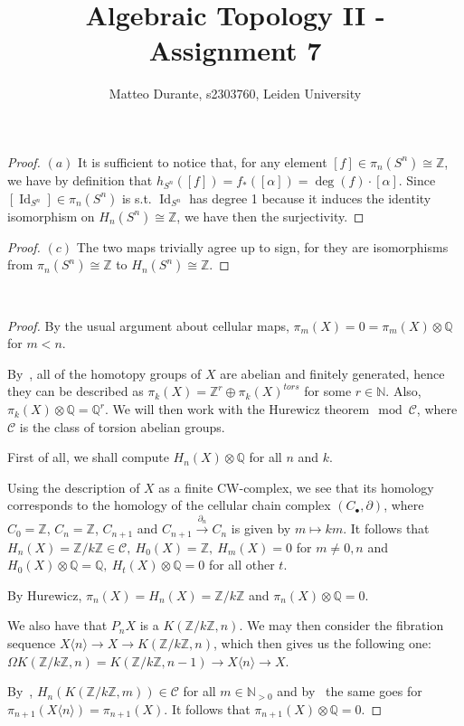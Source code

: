 \documentclass{article}
\newcommand{\numberset}{\mathbb}
\newcommand{\N}{\numberset{N}}
\newcommand{\Z}{\numberset{Z}}
\newcommand{\Q}{\numberset{Q}}
\newcommand{\exercise}[1]{\noindent {\bf Exercise #1}}
\DeclareMathOperator{\Id}{Id}
\begin{document}
\title{Algebraic Topology II - Assignment 7}

\author{Matteo Durante, s2303760, Leiden University}

\maketitle

\exercise{2}

\begin{proof}
    $(a)$ It is sufficient to notice that, for any element
    $[f]\in\pi_n(S^n)\cong\Z$, we have by definition that
    $h_{S^n}([f])=f_*([\alpha])=\deg(f)\cdot [\alpha]$. Since
    $[\Id_{S^n}]\in\pi_n(S^n)$ is s.t. $\Id_{S^n}$ has degree 1 because it
    induces the identity isomorphism on $H_n(S^n)\cong\Z$, we have then the
    surjectivity.
\end{proof}

\begin{proof}
    $(c)$ The two maps trivially agree up to sign, for they are isomorphisms
    from $\pi_n(S^n)\cong\Z$ to $H_n(S^n)\cong\Z$.
\end{proof}


~\\
\exercise{3}

\begin{proof}    
    By the usual argument about cellular maps, $\pi_m(X)=0=\pi_m(X)\otimes\Q$
    for $m<n$.
    
    By~\cite[thm. 12.1]{HM19}, all of the homotopy groups of $X$ are abelian and
    finitely generated, hence they can be described as
    $\pi_k(X)=\Z^r\oplus\pi_k(X)^{tors}$ for some $r\in\N$. Also,
    $\pi_k(X)\otimes\Q=\Q^r$. We will then work with the Hurewicz
    theorem$\mod\mathcal{C}$, where $\mathcal{C}$ is the class of torsion
    abelian groups.
    
    First of all, we shall compute $H_n(X)\otimes\Q$ for all $n$ and $k$.

    Using the description of $X$ as a finite CW-complex, we see that its
    homology corresponds to the homology of the cellular chain complex
    $(C_\bullet,\partial)$, where $C_0=\Z$, $C_n=\Z$, $C_{n+1}$ and
    $C_{n+1}\xrightarrow{\partial_n}C_n$ is given by $m\mapsto km$. It follows
    that $H_n(X)=\Z/k\Z\in\mathcal{C},\ H_0(X)=\Z,\ H_m(X)=0$ for $m\neq 0,n$
    and $H_0(X)\otimes\Q=\Q,\ H_t(X)\otimes\Q=0$ for all other $t$.

    By Hurewicz, $\pi_n(X)=H_n(X)=\Z/k\Z$ and $\pi_n(X)\otimes\Q=0$.

    We also have that $P_nX$ is a $K(\Z/k\Z,n)$. We may then consider the
    fibration sequence $X\langle n\rangle\rightarrow X\rightarrow K(\Z/k\Z,n)$,
    which then gives us the following one: $\Omega
    K(\Z/k\Z,n)=K(\Z/k\Z,n-1)\rightarrow X\langle n\rangle\rightarrow X$.

    By~\cite[lemma 13.16]{HM19}, $H_n(K(\Z/k\Z,m))\in\mathcal{C}$ for all
    $m\in\N_{>0}$ and by~\cite[lemma 13.15]{HM19} the same goes for
    $\pi_{n+1}(X\langle n\rangle)=\pi_{n+1}(X)$. It follows that
    $\pi_{n+1}(X)\otimes\Q=0$.
\end{proof}

\printbibliography
\end{document}
